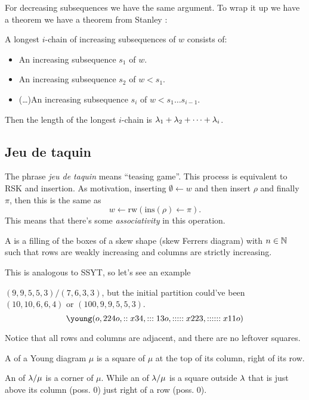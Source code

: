 \documentclass[12pt]{memoir}
\begin{document}
For decreasing subsequences we have the same argument. To wrap it up we have a theorem we have a theorem from Stanley \cite{StanleyEnum2}:

\begin{Th}
    A longest $i$-chain of increasing subsequences of $w$ consists of:
    \begin{itemize}
        \item An increasing subsequence $s_1$ of $w$.
        \item An increasing subsequence $s_2$ of $w\less s_1$.
        \item (\dots)An increasing subsequence $s_i$ of $w\less s_1\dots s_{i-1}$.
    \end{itemize}
    Then the length of the longest $i$-chain is $\lambda_1+\lambda_2+\dots+\lambda_i$.
\end{Th}

\subsection{Jeu de taquin}

The phrase \emph{jeu de taquin} means ``teasing game''. This process is equivalent to RSK and insertion. As motivation, inserting $\emptyset\leftarrow w$ and then insert $\rho$ and finally $\pi$, then this is the same as 
$$w\leftarrow\text{rw}(\text{ins}(\rho)\leftarrow \pi).$$
This means that there's some \emph{associativity} in this operation. 

\begin{Def}
    A  is a filling of the boxes of a skew shape (skew Ferrers diagram) with $n\in\mathbb{N}$ such that rows are weakly increasing and columns are strictly increasing.
\end{Def}

This is analogous to SSYT, so let's see an example

\begin{Ex}
    $(9,9,5,5,3)/(7,6,3,3)$, but the initial partition could've been $(10,10,6,6,4)$ or $(100,9,9,5,5,3)$. 
    $$\young(o,224o,::x34,:::13o,:::::x223,::::::x11o)$$
\end{Ex}

Notice that all rows and columns are adjacent, and there are no leftover squares.

\begin{Def}
    A  of a Young diagram $\mu$ is a square of $\mu$ at the top of its column, right of its row.\par 
    An  of $\lambda/\mu$ is a corner of $\mu$. While an  of $\lambda/\mu$ is a square outside $\lambda$ that is just above its column (poss. 0) just right of a row (poss. 0).
\end{Def}
\end{document}
